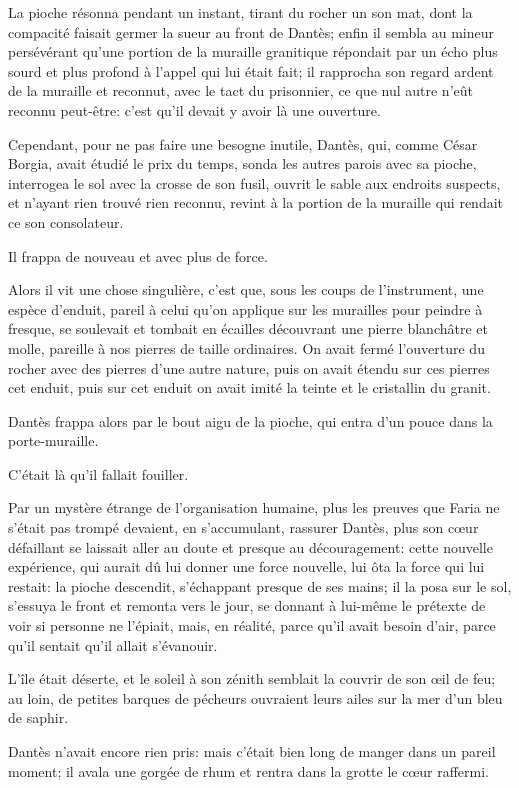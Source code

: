 La pioche résonna pendant un instant, tirant du rocher un son mat, dont la compacité faisait germer la sueur au front de Dantès; enfin il sembla au mineur persévérant qu'une portion de la muraille granitique répondait par un écho plus sourd et plus profond à l'appel qui lui était fait; il rapprocha son regard ardent de la muraille et reconnut, avec le tact du prisonnier, ce que nul autre n'eût reconnu peut-être: c'est qu'il devait y avoir là une ouverture.

Cependant, pour ne pas faire une besogne inutile, Dantès, qui, comme César Borgia, avait étudié le prix du temps, sonda les autres parois avec sa pioche, interrogea le sol avec la crosse de son fusil, ouvrit le sable aux endroits suspects, et n'ayant rien trouvé rien reconnu, revint à la portion de la muraille qui rendait ce son consolateur.

Il frappa de nouveau et avec plus de force.

Alors il vit une chose singulière, c'est que, sous les coups de l'instrument, une espèce d'enduit, pareil à celui qu'on applique sur les murailles pour peindre à fresque, se soulevait et tombait en écailles découvrant une pierre blanchâtre et molle, pareille à nos pierres de taille ordinaires. On avait fermé l'ouverture du rocher avec des pierres d'une autre nature, puis on avait étendu sur ces pierres cet enduit, puis sur cet enduit on avait imité la teinte et le cristallin du granit.

Dantès frappa alors par le bout aigu de la pioche, qui entra d'un pouce dans la porte-muraille.

C'était là qu'il fallait fouiller.

Par un mystère étrange de l'organisation humaine, plus les preuves que Faria ne s'était pas trompé devaient, en s'accumulant, rassurer Dantès, plus son cœur défaillant se laissait aller au doute et presque au découragement: cette nouvelle expérience, qui aurait dû lui donner une force nouvelle, lui ôta la force qui lui restait: la pioche descendit, s'échappant presque de ses mains; il la posa sur le sol, s'essuya le front et remonta vers le jour, se donnant à lui-même le prétexte de voir si personne ne l'épiait, mais, en réalité, parce qu'il avait besoin d'air, parce qu'il sentait qu'il allait s'évanouir.

L'île était déserte, et le soleil à son zénith semblait la couvrir de son œil de feu; au loin, de petites barques de pécheurs ouvraient leurs ailes sur la mer d'un bleu de saphir.

Dantès n'avait encore rien pris: mais c'était bien long de manger dans un pareil moment; il avala une gorgée de rhum et rentra dans la grotte le cœur raffermi.

